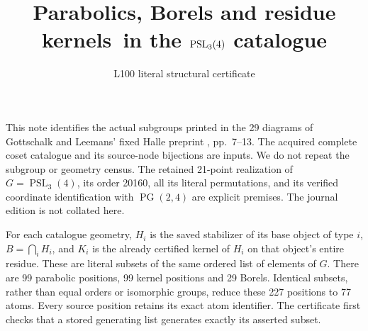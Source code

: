 \documentclass[11pt]{article}
\title{Parabolics, Borels and residue kernels\ in the $\PSL_3(4)$ catalogue}
\author{L100 literal structural certificate}\date{}
\newcommand{\PSL}{\operatorname{PSL}}\newcommand{\SL}{\operatorname{SL}}\newcommand{\GL}{\operatorname{GL}}
\newcommand{\PG}{\operatorname{PG}}\newcommand{\E}{\mathrm E}
\begin{document}
\maketitle
This note identifies the actual subgroups printed in the 29 diagrams of
Gottschalk and Leemans' fixed Halle preprint \cite{GL}, pp.~7--13.
The acquired complete coset catalogue and its source-node bijections are
inputs. We do not repeat the subgroup or geometry census. The retained
21-point realization of $G=\PSL_3(4)$, its order 20160, all its literal
permutations, and its verified coordinate identification with $\PG(2,4)$
are explicit premises. The journal edition is not collated here.

For each catalogue geometry, $H_i$ is the saved stabilizer of its base
object of type $i$, $B=\bigcap_iH_i$, and $K_i$ is the already certified
kernel of $H_i$ on that object's entire residue. These are literal subsets
of the same ordered list of elements of $G$. There are 99 parabolic
positions, 99 kernel positions and 29 Borels. Identical subsets, rather
than equal orders or isomorphic groups, reduce these 227 positions to
77 atoms. Every source position retains its exact atom identifier.
The certificate first checks that a stored generating list generates
exactly its asserted subset.
\end{document}
